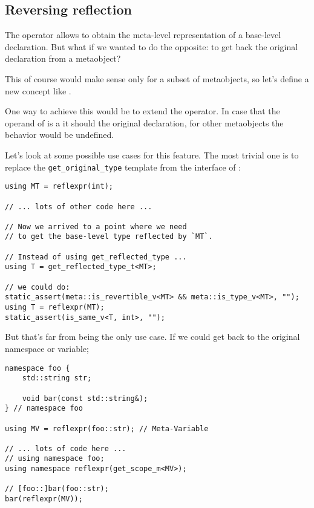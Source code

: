 \subsection{Reversing reflection}
\label{fut-reverse-reflection}

The \verb@reflexpr@ operator allows to obtain the meta-level representation
of a base-level declaration. But what if we wanted to do the opposite: to
get back the original declaration from a metaobject?

This of course would make sense only for a subset of metaobjects, so let's
define a new concept like .

One way to achieve this would be to extend the \verb@reflexpr@
operator. In case that the operand of \verb@reflexpr@ is a 
it should  the original declaration, for other metaobjects the behavior
would be undefined.

Let's look at some possible use cases for this feature.
The most trivial one is to replace the \texttt{get\_original\_type}
template from the interface of :

\begin{verbatim}
using MT = reflexpr(int);

// ... lots of other code here ...

// Now we arrived to a point where we need
// to get the base-level type reflected by `MT`.

// Instead of using get_reflected_type ...
using T = get_reflected_type_t<MT>;

// we could do:
static_assert(meta::is_revertible_v<MT> && meta::is_type_v<MT>, "");
using T = reflexpr(MT);
static_assert(is_same_v<T, int>, "");

\end{verbatim}

But that's far from being the only use case. If we could get back to
the original namespace or variable;

\begin{verbatim}
namespace foo {
	std::string str;

	void bar(const std::string&);
} // namespace foo

using MV = reflexpr(foo::str); // Meta-Variable

// ... lots of code here ...
// using namespace foo;
using namespace reflexpr(get_scope_m<MV>);

// [foo::]bar(foo::str);
bar(reflexpr(MV));

\end{verbatim}

